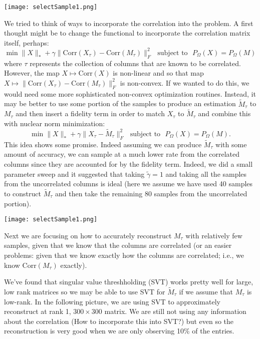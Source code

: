 \documentclass[12pt]{article}
\newcommand{\Corr}{\text{Corr}}
\begin{document}
 \begin{center}
\texttt{[image: selectSample1.png]}\\
\end{center}  
  
\noindent\makebox[\linewidth]{\rule{\textwidth}{2pt}} 
  
 We tried to think of  ways to incorporate the correlation into the problem. A first thought might be to change the functional to incorporate the correlation matrix itself, perhaps: $$\min \| X \|_* + \gamma \| \Corr(X_\tau) - \Corr(M_\tau)\|^2_F \,\,\,\, \text{subject to} \,\,\,\, P_\Omega(X) = P_{\Omega}(M)$$ where $\tau$ represents the collection of columns that are known to be correlated. However, the map $X\mapsto \Corr(X)$ is non-linear and so that map $X\mapsto \| \Corr(X_\tau) - \Corr(M_\tau)\|_F^2$ is non-convex. If we wanted to do this, we would need some more sophisticated non-convex optimization routines. Instead, it may be better to use some portion of the samples to produce an estimation $\tilde M_\tau$ to $M_\tau$ and then insert a fidelity term in order to match $X_\tau$ to $\tilde M_\tau$ and combine this with nuclear norm minimization: $$\min \| X \|_* + \gamma \| X_\tau - \tilde M_\tau\|^2_F \,\,\,\, \text{subject to} \,\,\,\, P_\Omega(X) = P_{\Omega}(M).$$ This idea shows some promise. Indeed assuming we can produce $\tilde M_\tau$ with some amount of accuracy, we can sample at a much lower rate from the correlated columns since they are accounted for by the fidelity term. Indeed, we did a small parameter sweep and it suggested that taking $\tilde \gamma =1$ and taking all the samples from the uncorrelated columns is ideal (here we assume we have used 40 samples to construct $\tilde M_\tau$ and then take the remaining $80$ samples from the uncorrelated portion). 
 
  \begin{center}
\texttt{[image: selectSample1.png]}\\
\end{center}  
  
\noindent\makebox[\linewidth]{\rule{\textwidth}{2pt}} 
  
Next we are focusing on how to accurately reconstruct $M_\tau$ with relatively few samples, given that we know that the columns are correlated (or an easier problems: given that we know exactly how the columns are correlated; i.e., we know $\Corr(M_\tau)$ exactly). 

We've found that singular value threshholding (SVT) works pretty well for large, low rank matrices so we may be able to use SVT for $\tilde M_\tau$ if we assume that $M_\tau$ is low-rank. In the following picture, we are using SVT to approximately reconstruct at rank 1, $300 \times 300$ matrix. We are still not using any information about the correlation (How to incorporate this into SVT?) but even so the reconstruction is very good when we are only observing 10\% of the entries.
\end{document}
